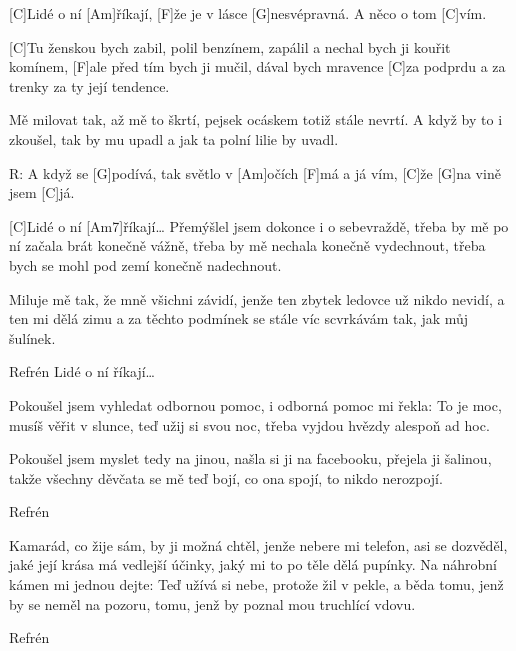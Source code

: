 
[C]Lidé o ní [Am]\null říkají,
[F]\null že je v lásce [G]nesvépravná.
A něco o tom [C]vím.

[C]Tu ženskou bych zabil, polil benzínem,
zapálil a nechal bych ji kouřit komínem,
[F]ale před tím bych ji mučil, dával bych mravence
[C]za podprdu a za trenky za ty její tendence.

Mě milovat tak, až mě to škrtí,
pejsek ocáskem totiž stále nevrtí.
A když by to i zkoušel, tak by mu upadl
a jak ta polní lilie by uvadl.

R:
A když se [G]podívá,
tak světlo v [Am]očích [F]má a já vím, [C]\null že
[G]na vině jsem [C]já.

[C]Lidé o ní [Am7]\null říkají…
\slpc
Přemýšlel jsem dokonce i o sebevraždě,
třeba by mě po ní začala brát konečně vážně,
třeba by mě nechala konečně vydechnout,
třeba bych se mohl pod zemí konečně nadechnout.

Miluje mě tak, že mně všichni závidí,
jenže ten zbytek ledovce už nikdo nevidí,
a ten mi dělá zimu a za těchto podmínek
se stále víc scvrkávám tak, jak můj šulínek.

Refrén
Lidé o ní říkají…

Pokoušel jsem vyhledat odbornou pomoc,
i odborná pomoc mi řekla: To je moc,
musíš věřit v slunce, teď užij si svou noc,
třeba vyjdou hvězdy alespoň ad hoc.

Pokoušel jsem myslet tedy na jinou,
našla si ji na facebooku, přejela ji šalinou,
takže všechny děvčata se mě teď bojí,
co ona spojí, to nikdo nerozpojí.

Refrén

Kamarád, co žije sám, by ji možná chtěl,
jenže nebere mi telefon, asi se dozvěděl,
jaké její krása má vedlejší účinky,
jaký mi to po těle dělá pupínky.
Na náhrobní kámen mi jednou dejte:
Teď užívá si nebe, protože žil v pekle,
a běda tomu, jenž by se neměl na pozoru,
tomu, jenž by poznal mou truchlící vdovu.

Refrén




